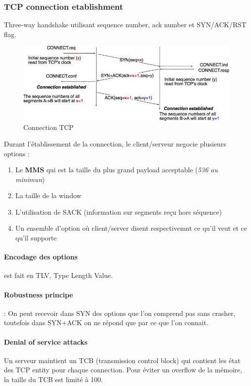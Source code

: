 \subsubsection{TCP connection etablishment}
Three-way handshake utilisant sequence number, ack number et SYN/ACK/RST flag.

\begin{figure}[!ht]
  \centering
  \includegraphics[width=12cm]{tcpconnect.jpg}
  \caption{Connection TCP}
  \label{fig:tcpconnect}
\end{figure}

Durant l'établissement de la connection, le client/serveur negocie plusieurs options :
\begin{enumerate}
  \item Le \textbf{MMS} qui est la taille du plus grand payload acceptable (\textit{536 au minimun})
  \item La taille de la window
  \item L'utilisation de SACK (information sur segments reçu hors séquence)
  \item Un ensemble d'option où client/server disent respectivemnt ce qu'il veut et ce
    qu'il supporte
\end{enumerate}

\paragraph{Encodage des options} est fait en \textsc{TLV}, Type Length Value.

\paragraph{Robustness principe} : On peut recevoir dans SYN des options que l'on
comprend pas sans crasher, toutefois dans SYN+ACK on ne répond que par ce
que l'on connait.

\paragraph{Denial of service attacks}
Un serveur maintient un TCB (transmission control block) qui contient 
les état des TCP entity pour chaque connection. Pour éviter un overflow
de la mémoire, la taille du TCB est limité à 100.

